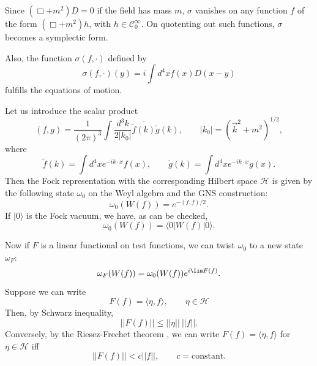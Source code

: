 \vspace{-.2cm}

Since $(\Box + m^2)D = 0$ if the field has mass $m$, $\sigma$ vanishes on any function $f$ of the form $(\Box + m^2)h$, with $h\in \mathcal{C}^{\infty}_{0}$. On quotenting out such functions, $\sigma$ becomes a symplectic form.

Also, the function $\sigma (f,\cdot)$ defined by
\begin{equation}
\sigma(f,\cdot)(y)=i\int d^{4}xf(x)D(x-y)\label{chap1-eq2.16}
\end{equation}
fulfills the equations of motion.

Let us introduce the scalar product
$$
(f,g)=\frac{1}{(2\pi)^{3}}\int \dfrac{d^{3}k}{2|k_{0}|}\overline{\widetilde{f}(k)}\widetilde{g}(k),\qquad |k_{0}|=(\overrightarrow{k}^{2}+m^{2})^{1/2},
$$
where
\begin{equation}
\widetilde{f}(k)=\int d^{4}xe^{-ik\cdot x}f(x),\qquad \widetilde{g}(k)=\int d^{4}xe^{-ik\cdot x}g(x).\label{chap1-eq2.17}
\end{equation}
Then the Fock representation with the corresponding Hilbert space $\mathcal{H}$ is given by the following state $\omega_{0}$ on the Weyl algebra and the GNS construction:
\begin{equation}
\omega_{0}(W(f))=e^{-(f,f)/2}.\label{chap1-eq2.18}
\end{equation}
If $|0\rangle$ is the Fock vacuum, we have, as can be checked,
\begin{equation}
\omega_{0}(W(f))=\langle 0|W (f)|0\rangle.\label{chap1-eq2.19}
\end{equation}

Now if $F$ is a linear functional on test functions, we can twist $\omega_{0}$ to a new state $\omega_{F}$:
\begin{equation}
\omega_{F}(W(f))=\omega_{0}(W(f))e^{i \Iim F(f)}.\label{chap1-eq2.20} 
\end{equation}
Suppose we can write
\begin{equation}
F(f) = \langle\eta, f\rangle, \qquad \eta \in \mathcal{H} \label{chap1-eq2.21}
\end{equation}
Then, by Schwarz inequality,
\begin{equation}
|| F(f) || \leq ||\eta || ~ || f ||.\label{chap1-eq2.22}
\end{equation}
Conversely, by the Riesez-Frechet theorem \cite{key9}, we can write $F(f)= \langle \eta, f\rangle$ for $\eta \in \mathcal{H}$ iff
\begin{equation}
|| F(f) || < c || f||, \qquad c= \text{constant}. \label{chap1-eq2.23}
\end{equation}

